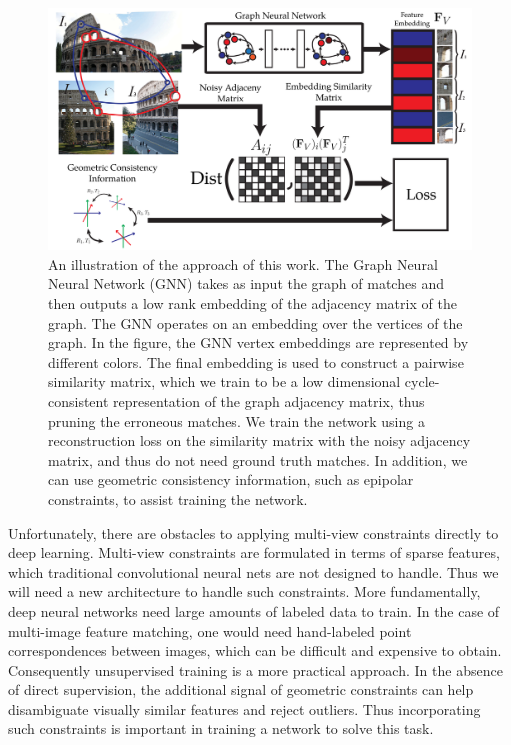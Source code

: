 \documentclass{article} %
\begin{document}
\begin{figure}[t]
\begin{center}
  \includegraphics[width=0.8\linewidth]{figures-CycleConsistencyMainFigure-v4.pdf}
\end{center}
  \caption{
    An illustration of the approach of this work.
    The Graph Neural Neural Network (GNN) \citep{battaglia2018relational} takes as input the graph of matches and then outputs a low rank embedding of the adjacency matrix of the graph.
    The GNN operates on an embedding over the vertices of the graph.
    In the figure, the GNN vertex embeddings are represented by different colors.
    The final embedding is used to construct a pairwise similarity matrix, which we train to be a low dimensional cycle-consistent representation of the graph adjacency matrix, thus pruning the erroneous matches.
    We train the network using a reconstruction loss on the similarity matrix with the noisy adjacency matrix, and thus do not need ground truth matches.
    In addition, we can use geometric consistency information, such as epipolar constraints, to assist training the network.
  }
\label{fig:pipeline}
\end{figure}

Unfortunately, there are obstacles to applying multi-view constraints directly to deep learning. 
Multi-view constraints are formulated in terms of sparse features, which traditional convolutional neural nets are not designed to handle.
Thus we will need a new architecture to handle such constraints.
More fundamentally, deep neural networks need large amounts of labeled data to train.
In the case of multi-image feature matching, one would need hand-labeled point correspondences between images, which can be difficult and expensive to obtain.
Consequently unsupervised training is a more practical approach.
In the absence of direct supervision, the additional signal of geometric constraints can help disambiguate visually similar features and reject outliers.
Thus incorporating such constraints is important in training a network to solve this task.
\end{document}
